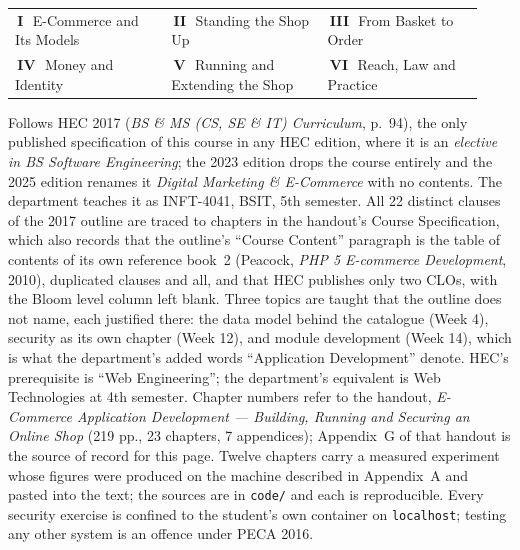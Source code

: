 \documentclass[10pt,a4paper]{article}
\makeatletter
\newcommand{\chipw}[2]{{\setlength{\fboxsep}{1.3pt}\colorbox{#1}{%
  \fontsize{6.4}{7}\selectfont\bfseries\color{white}\,#2\,}}}
\newcommand{\legend}[6]{{\fontsize{6.6}{8}\selectfont\color{sub}%
  \begin{tabular}{@{}p{0.31\linewidth}p{0.31\linewidth}p{0.31\linewidth}@{}}
  \chipw{p1}{I}\ #1 & \chipw{p2}{II}\ #2 & \chipw{p3}{III}\ #3 \\[1pt]
  \chipw{p4}{IV}\ #4 & \chipw{p5}{V}\ #5 & \chipw{p6}{VI}\ #6
  \end{tabular}}}
\makeatother
\begin{document}
\vspace{3pt}
\legend{E-Commerce and Its Models}{Standing the Shop Up}{From Basket to Order}
       {Money and Identity}{Running and Extending the Shop}{Reach, Law and Practice}

\vspace{1pt}
{\fontsize{6.3}{7.6}\selectfont\color{neutral}%
Follows HEC 2017 (\emph{BS \& MS (CS, SE \& IT) Curriculum}, p.\ 94), the only published specification of this course in any HEC edition, where it is an \emph{elective in BS Software Engineering}; the 2023 edition drops the course entirely and the 2025 edition renames it \emph{Digital Marketing \& E-Commerce} with no contents. The department teaches it as INFT-4041, BSIT, 5th semester. All 22 distinct clauses of the 2017 outline are traced to chapters in the handout's Course Specification, which also records that the outline's ``Course Content'' paragraph is the table of contents of its own reference book~2 (Peacock, \emph{PHP 5 E-commerce Development}, 2010), duplicated clauses and all, and that HEC publishes only two CLOs, with the Bloom level column left blank. Three topics are taught that the outline does not name, each justified there: the data model behind the catalogue (Week 4), security as its own chapter (Week 12), and module development (Week 14), which is what the department's added words ``Application Development'' denote. HEC's prerequisite is ``Web Engineering''; the department's equivalent is Web Technologies at 4th semester. Chapter numbers refer to the handout, \emph{E-Commerce Application Development --- Building, Running and Securing an Online Shop} (219 pp., 23 chapters, 7 appendices); Appendix~G of that handout is the source of record for this page. Twelve chapters carry a measured experiment whose figures were produced on the machine described in Appendix~A and pasted into the text; the sources are in \texttt{code/} and each is reproducible. Every security exercise is confined to the student's own container on \texttt{localhost}; testing any other system is an offence under PECA 2016.\par}
\end{document}
